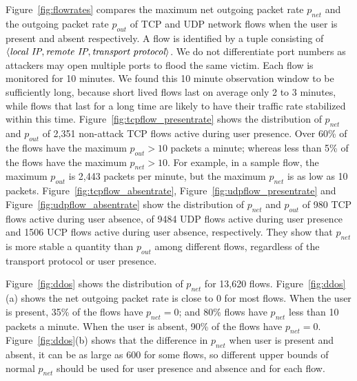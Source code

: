 Figure~\ref{fig:flowrates} compares the maximum net
outgoing packet rate $p_{net}$ and the outgoing packet rate
$p_{out}$ of TCP and UDP network flows when the user is present 
and absent respectively.  A flow is identified by a tuple consisting
of $\langle \mbox{\it local IP}, \mbox{\it remote IP}, 
\mbox{\it transport protocol} \rangle$.
We do not differentiate port numbers as attackers may open
multiple ports to flood the same victim. 
Each flow is monitored for 10 minutes. 
We found this 10 minute observation window to be sufficiently long, because short lived flows last on average only 2 to 3 minutes, 
while flows that last for a long time are likely to
have their traffic rate stabilized within this time.
Figure~\ref{fig:tcpflow_presentrate} shows the distribution of $p_{net}$
and $p_{out}$ of 2,351 non-attack TCP flows active during user presence.
Over 60\% of the flows have the maximum $p_{out}>10$ packets a
minute; whereas less than 5\% of the flows have the maximum
$p_{net}>10$. 
For example, in a sample flow, the maximum $p_{out}$ is 2,443 packets per
minute, but the maximum $p_{net}$ is as low as 10 packets.
Figure~\ref{fig:tcpflow_absentrate}, Figure~\ref{fig:udpflow_presentrate}
and Figure~\ref{fig:udpflow_absentrate} show the distribution of
$p_{net}$ and $p_{out}$ of 980 TCP flows active during user absence,
of 9484 UDP flows active during user presence and 1506 UCP flows
active during user absence, respectively.
They show that $p_{net}$ is more stable a quantity than
$p_{out}$ among different flows,
regardless of the transport protocol or user presence.

Figure~\ref{fig:ddos} shows the distribution of $p_{net}$ for 13,620 flows.
Figure~\ref{fig:ddos}(a) shows the net outgoing packet rate is close
to 0 for most flows. When the user is present, 35\% of the flows
have $p_{net}=0$; and 80\% flows have $p_{net}$ less than 10 packets
a minute. When the user is absent, 90\% of the flows have
$p_{net}=0$. Figure~\ref{fig:ddos}(b) shows that the difference in
$p_{net}$ when user is present and absent, it can be as large as 600
for some flows, so different upper bounds of normal $p_{net}$ should
be used for user presence and absence and for each flow.

